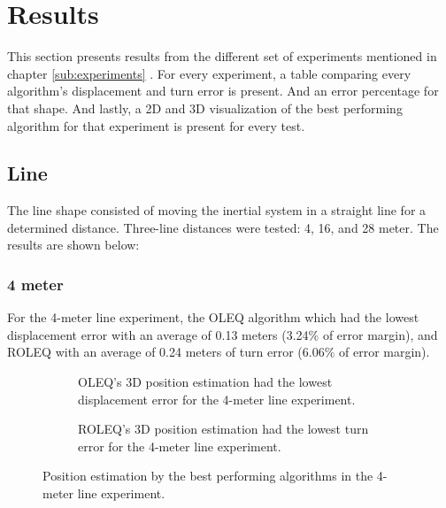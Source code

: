 \section{Results}

This section presents results from the different set of experiments mentioned in chapter \ref{sub:experiments} . For every experiment, a table comparing every algorithm's displacement and turn error is present. And an error percentage for that shape. And lastly, a 2D and 3D visualization of the best performing algorithm for that experiment is present for every test.

\subsection{Line}

The line shape consisted of moving the inertial system in a straight line for a determined distance. Three-line distances were tested: 4, 16, and 28 meter. The results are shown below:

\subsubsection{4 meter}

For the 4-meter line experiment, the OLEQ algorithm which had the lowest displacement error with an average of 0.13 meters (3.24\% of error margin), and ROLEQ with an average of 0.24 meters of turn error (6.06\% of error margin).

\begin{figure}[!h]
    \centering
    
\end{figure}

\begin{figure}[!h]
    \centering
    \begin{subfigure}{0.49\textwidth}
        \centering
        \resizebox{1\linewidth}{!}{}
        \caption{ OLEQ's 3D position estimation had the lowest displacement error for the 4-meter line experiment. }
        \label{fig:line4_2D}
    \end{subfigure}
    \begin{subfigure}{0.49\textwidth}
        \centering
        \resizebox{1\linewidth}{!}{}
        \caption{ ROLEQ's 3D position estimation had the lowest turn error for the 4-meter line experiment. }
        \label{fig:line4_3D}
    \end{subfigure}
    \caption{Position estimation by the best performing algorithms in the 4-meter line experiment.}
    \label{fig:line4}
\end{figure}

